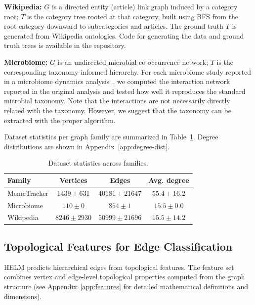 \documentclass{article}
\begin{document}
    \textbf{Wikipedia:} $G$ is a directed entity (article) link graph induced by a category root; $T$ is the category tree rooted at that category, built using BFS from the root category downward to subcategories and articles. The ground truth $T$ is generated from Wikipedia ontologies. Code for generating the data and ground truth trees is available in the repository.

    \textbf{Microbiome:} $G$ is an undirected microbial co-occurrence network; $T$ is the corresponding taxonomy-informed hierarchy. For each microbiome study reported in a microbiome dynamics analysis~\citep{shtossel2025shifting}, we computed the interaction network reported in the original analysis and tested how well it reproduces the standard microbial taxonomy. Note that the interactions are not necessarily directly related with the taxonomy. However, we suggest that the taxonomy can be extracted with the proper algorithm.

    Dataset statistics per graph family are summarized in Table~\ref{tab:dataset_stats}. Degree distributions are shown in Appendix~\ref{app:degree-dist}.

    \begin{table}[t]
        \centering
        \footnotesize
        \begin{tabular}{lccc}
            \toprule Family      & Vertices        & Edges             & Avg. degree     \\
            \midrule MemeTracker & $1439 \pm 631$  & $40181 \pm 21647$ & $55.4 \pm 16.2$ \\
            Microbiome           & $110 \pm 0$     & $854 \pm 1$       & $15.5 \pm 0.0$  \\
            Wikipedia            & $8246 \pm 2930$ & $50999 \pm 21696$ & $15.5 \pm 14.2$ \\
            \bottomrule
        \end{tabular}
        \caption{Dataset statistics across families.}
        \label{tab:dataset_stats}
    \end{table}

    \subsection{Topological Features for Edge Classification}
    HELM predicts hierarchical edges from topological features. The feature set combines vertex and edge-level topological properties computed from the graph structure (see Appendix~\ref{app:features} for detailed mathematical definitions and dimensions).
\end{document}
